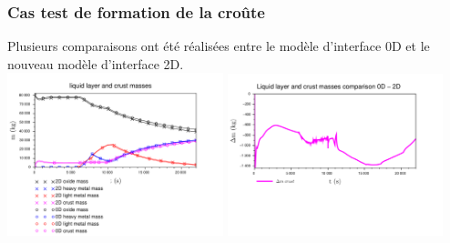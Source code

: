 \documentclass{beamer}
\begin{document}
\begin{frame}[t]
    \frametitle{Cas test de formation de la croûte}
	\footnotesize
	
    Plusieurs comparaisons ont été réalisées entre le modèle d'interface 0D et le nouveau modèle d'interface 2D.\\

    \includegraphics[width=0.47\textwidth]{Figures/IndustrialTestmasses.pdf}
    \includegraphics[width=0.47\textwidth]{Figures/IndustrialTestdiffMasses.pdf}

\end{frame}
\end{document}
